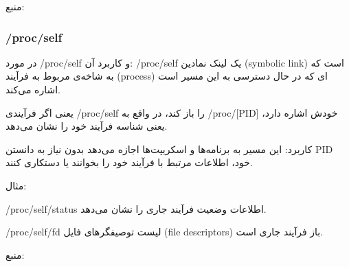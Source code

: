\documentclass[12pt]{article}
\begin{document}
	منبع: \cite{a1}
	
	\subsubsection*{/proc/self}
	
	در مورد /proc/self و کاربرد آن:
	/proc/self یک لینک نمادین \textenglish{(symbolic link)} است که به شاخه‌ی مربوط به فرآیند (process) ای که در حال دسترسی به این مسیر است اشاره می‌کند.
	
	یعنی اگر فرآیندی /proc/self را باز کند، در واقع به /proc/[PID] خودش اشاره دارد، یعنی شناسه فرآیند خود را نشان می‌دهد.
	
	کاربرد: این مسیر به برنامه‌ها و اسکریپت‌ها اجازه می‌دهد بدون نیاز به دانستن PID خود، اطلاعات مرتبط با فرآیند خود را بخوانند یا دستکاری کنند.
	
	مثال:
	
	/proc/self/status اطلاعات وضعیت فرآیند جاری را نشان می‌دهد.
	
	/proc/self/fd لیست توصیفگرهای فایل \textenglish{(file descriptors)} باز فرآیند جاری است.
	
	منبع: \cite{a2}
	
	

	
	\newpage
	\begin{LTR}
		\printbibliography[title={مراجع}]
	\end{LTR}

	
\end{document}
